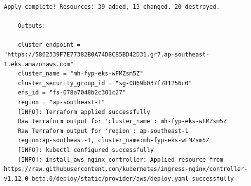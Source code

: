 \begin{lstlisting}[caption={\texttt{cloudkube} successful provisioning output}, breaklines=true, breakatwhitespace=false]
    Apply complete! Resources: 39 added, 13 changed, 20 destroyed.
    
    Outputs:
    
    cluster_endpoint = "https://5862339F7E77382B0A74D8C85BD42D31.gr7.ap-southeast-1.eks.amazonaws.com"
    cluster_name = "mh-fyp-eks-wFMZsm5Z"
    cluster_security_group_id = "sg-0869b037f781256c0"
    efs_id = "fs-078a7048b2c301c27"
    region = "ap-southeast-1"
    [INFO]: Terraform applied successfully
    Raw Terraform output for 'cluster_name': mh-fyp-eks-wFMZsm5Z
    Raw Terraform output for 'region': ap-southeast-1
    region:ap-southeast-1, cluster_name:mh-fyp-eks-wFMZsm5Z
    [INFO]: kubectl configured successfully
    [INFO]: install_aws_nginx_controller: Applied resource from https://raw.githubusercontent.com/kubernetes/ingress-nginx/controller-v1.12.0-beta.0/deploy/static/provider/aws/deploy.yaml successfully

\end{lstlisting}
